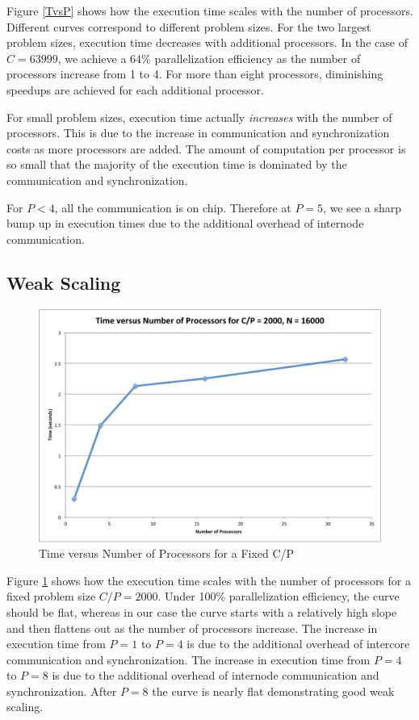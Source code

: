 \documentclass[11pt]{article} %
\begin{document}
Figure \ref{TvsP} shows how the execution time scales with the number of processors. Different curves correspond to different problem sizes. For the two largest problem sizes, execution time decreases with additional processors. In the case of $C = 63999$, we achieve a 64\% parallelization efficiency as the number of processors increase from 1 to 4. For more than eight processors, diminishing speedups are achieved for each additional processor.

For small problem sizes, execution time actually \emph{increases} with the number of processors. This is due to the increase in communication and synchronization costs as more processors are added. The amount of computation per processor is so small that the majority of the execution time is dominated by the communication and synchronization.

For $P < 4$, all the communication is on chip. Therefore at $P = 5$, we see a sharp bump up in execution times due to the additional overhead of internode communication. 

\subsection{Weak Scaling}

\begin{figure}
\begin{centering}
\includegraphics[width=0.5\paperwidth]{figures/TvsP-fixed.pdf}
\caption{Time versus Number of Processors for a Fixed C/P}
\label{TvsP-fixed}
\end{centering}
\end{figure}

Figure \ref{TvsP-fixed} shows how the execution time scales with the number of processors for a fixed problem size $C/P = 2000$. Under 100\% parallelization efficiency, the curve should be flat, whereas in our case the curve starts with a relatively high slope and then flattens out as the number of processors increase. The increase in execution time from $P = 1$ to $P = 4$ is due to the additional overhead of intercore communication and synchronization. The increase in execution time from $P = 4$ to $P = 8$ is due to the additional overhead of internode communication and synchronization. After $P = 8$ the curve is nearly flat demonstrating good weak scaling.
\end{document}
